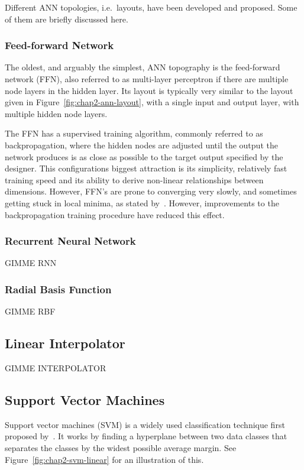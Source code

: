 Different ANN topologies, i.e.\ layouts, have been developed and proposed. Some of them are briefly discussed here.

\subsubsection{Feed-forward Network}

The oldest, and arguably the simplest, ANN topography is the feed-forward network (FFN), also referred to as multi-layer perceptron if there are multiple node layers in the hidden layer. Its layout is typically very similar to the layout given in Figure~\ref{fig:chap2-ann-layout}, with a single input and output layer, with multiple hidden node layers. 

The FFN has a supervised training algorithm, commonly referred to as backpropagation, where the hidden nodes are adjusted until the output the network produces is as close as possible to the target output specified by the designer. This configurations biggest attraction is its simplicity, relatively fast training speed and its ability to derive non-linear relationships between dimensions. However, FFN's are prone to converging very slowly, and sometimes getting stuck in local minima, as stated by~\cite{svozil1997introduction}. However, improvements to the backpropagation training procedure have reduced this effect.

\subsubsection{Recurrent Neural Network}

GIMME RNN

\subsubsection{Radial Basis Function}

GIMME RBF

\subsection{Linear Interpolator}

GIMME INTERPOLATOR

\subsection{Support Vector Machines}

Support vector machines (SVM) is a widely used classification technique first proposed by~\cite{vapnik1995support}. It works by finding a hyperplane between two data classes that separates the classes by the widest possible average margin. See Figure~\ref{fig:chap2-svm-linear} for an illustration of this.

